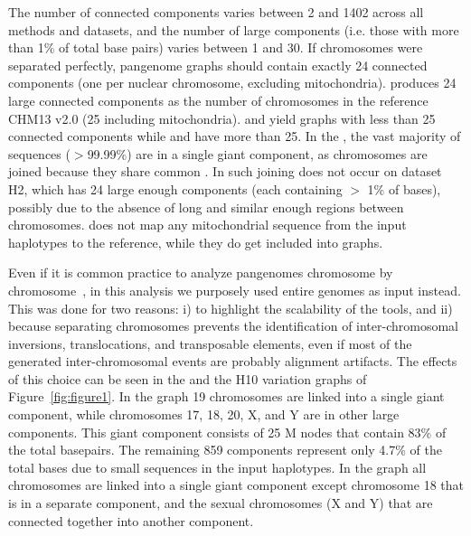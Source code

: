 The number of connected components varies between 2 and 1402 across all methods and datasets, and the number of large components (i.e. those with more than 1\% of total base pairs) varies between 1 and 30. 
If chromosomes were separated perfectly, pangenome graphs should contain exactly 24 connected components (one per nuclear chromosome, excluding mitochondria). \minigraph produces 24 large connected components as the number of chromosomes in the reference CHM13 v2.0 (25 including mitochondria).
\bifrost and \mcactus yield graphs with less than 25 connected components  while \mdbg and \pggb have more than 25.
In the \bifrost \dbg, the vast majority of sequences ($>$99.99\%) are in a single giant component, as chromosomes are joined because they share common \kmers. In \mdbg such joining does not occur on dataset H2, which has 24 large enough components (each containing $>$ 1\% of bases), possibly due to the absence of long and similar enough regions between chromosomes. 
\minigraph does not map any mitochondrial sequence from the input haplotypes to the reference, while they do get included into \mcactus graphs.

Even if it is common practice to analyze pangenomes chromosome by chromosome~\cite{hdpr,mcactus}, in this analysis we purposely used entire genomes as input instead. This was done for two reasons: i) to highlight the scalability of the tools, and ii) because separating chromosomes prevents the identification of inter-chromosomal inversions, translocations, and transposable elements, even if most of the generated inter-chromosomal events are probably alignment artifacts.
The effects of this choice can be seen in the \pggb and the \mcactus H10 variation graphs of Figure~\ref{fig:figure1}. In the \pggb graph 19 chromosomes are linked into a single giant component, while chromosomes 17, 18, 20, X, and Y are in other large components. This giant component consists of 25 M nodes that contain  83\% of the total basepairs. The remaining 859 components represent only 4.7\% of the total bases due to small sequences in the input haplotypes. 
In the \mcactus graph all chromosomes are linked into a single giant component except chromosome 18 that is in a separate component, and the sexual chromosomes (X and Y) that are connected together into another component.

